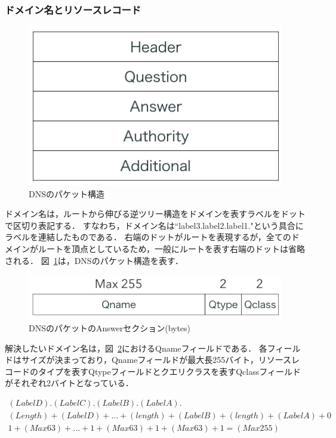 
\subsubsection{ドメイン名とリソースレコード}
\begin{figure}[h]
 \centering
 \includegraphics[scale=0.7]{figure/dns-format.png}
 \caption{DNSのパケット構造}
 \label{fig:dns-format}
\end{figure}

ドメイン名は，ルートから伸びる逆ツリー構造をドメインを表すラベルをドットで区切り表記する．
すなわち，ドメイン名は``label3.label2.label1."という具合にラベルを連結したものである．
右端のドットがルートを表現するが，全てのドメインがルートを頂点としているため，一般にルートを表す右端のドットは省略される．
図~\ref{fig:dns-format}は，DNSのパケット構造を表す．

\begin{figure}[h]
 \centering
 \includegraphics[scale=0.6]{figure/dns-answer.png}
 \caption{DNSのパケットのAnswerセクション(bytes)}
 \label{fig:dns-answer}
\end{figure}

解決したいドメイン名は，図~\ref{fig:dns-answer}におけるQnameフィールドである．
各フィールドはサイズが決まっており，Qnameフィールドが最大長255バイト，リソースレコードのタイプを表すQtypeフィールドとクエリクラスを表すQclassフィールドがそれぞれ2バイトとなっている．

\vspace{-1zh}
\begin{eqnarray}
 (LabelD).(LabelC).(LabelB).(LabelA). \label{eq:domain-name} \\
 (Length) + (LabelD) + ... + (length) + (LabelB) + (length) + (LabelA) + 0 \label{eq:label-name} \\ 
 1 + (Max 63) + ... + 1 + (Max 63) + 1 + (Max 63) + 1 = (Max 255) \label{eq:length-label-domain}
\end{eqnarray}

